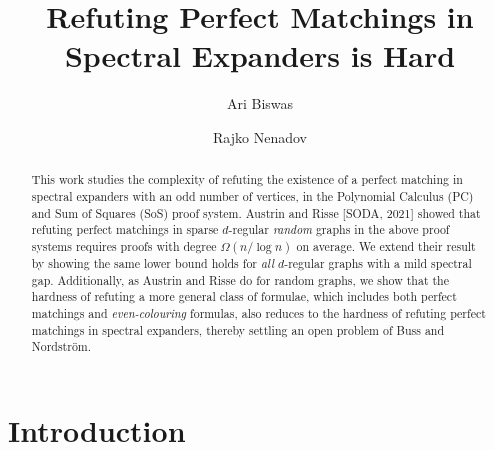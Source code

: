 \documentclass[11pt]{article}
\title{Refuting Perfect Matchings in Spectral Expanders is Hard}
\author{}
\author[1]{Ari Biswas}
\author[2]{Rajko Nenadov}
\affil[1]{\small University Of Warwick, United Kingdom}
\affil[2]{\small University Of Auckland, New Zealand}
\date{}
\begin{document}
\maketitle
\begin{abstract}
This work studies the complexity of refuting the existence of a perfect matching in spectral expanders with an odd number of vertices, in the Polynomial Calculus (PC) and Sum of Squares (SoS) proof system.
Austrin and Risse [SODA, 2021] showed that refuting perfect matchings in sparse $d$-regular \emph{random} graphs in the above proof systems requires proofs with degree $\Omega(n/\log n)$ on average. 
We extend their result by showing the same lower bound holds for \emph{all} $d$-regular graphs with a mild spectral gap.
Additionally, as Austrin and Risse do for random graphs, we show that the hardness of refuting a more general class of formulae, which includes both perfect matchings and \emph{even-colouring} formulas, also reduces to the hardness of refuting perfect matchings in spectral expanders, thereby settling an open problem of Buss and Nordstr\"{o}m.
\end{abstract}

\section{Introduction}


\end{document}
